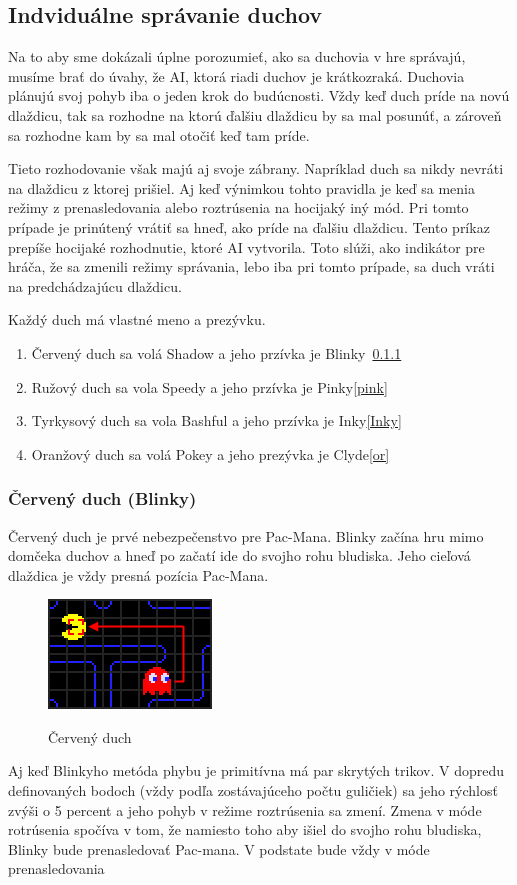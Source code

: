 \documentclass[10pt,oneside,slovak,a4paper]{article}
\begin{document}
\subsection{Indviduálne správanie duchov}
Na to aby sme dokázali úplne porozumieť, ako sa duchovia v hre správajú, musíme brať do úvahy, že AI, ktorá riadi duchov je krátkozraká. Duchovia plánujú svoj pohyb iba o jeden krok do budúcnosti. Vždy keď duch príde na novú dlaždicu, tak sa rozhodne na ktorú ďalšiu dlaždicu by sa mal posunúť, a zároveň sa rozhodne kam by sa mal otočiť keď tam príde. 

Tieto rozhodovanie však majú aj svoje zábrany. Napríklad duch sa nikdy nevráti na dlaždicu z ktorej prišiel. Aj keď výnimkou tohto pravidla je keď sa menia režimy z prenasledovania alebo roztrúsenia na hocijaký iný mód. Pri tomto prípade je prinútený vrátiť sa hneď, ako príde na ďalšiu dlaždicu. Tento príkaz prepíše hocijaké rozhodnutie, ktoré AI vytvorila. Toto slúži, ako indikátor pre hráča, že sa zmenili režimy správania, lebo iba pri tomto prípade, sa duch vráti na predchádzajúcu dlaždicu.\cite{2.zdroj}

Každý duch má vlastné meno a prezývku.
\begin{enumerate}
    \item Červený duch sa volá Shadow a jeho przívka je Blinky~\ref{cerv}
    \item Ružový duch sa vola Speedy a jeho przívka je Pinky\ref{pink}
    \item Tyrkysový duch sa vola Bashful a jeho przívka je Inky\ref{Inky}
     \item Oranžový duch sa volá Pokey a jeho prezývka je Clyde\ref{or}
\end{enumerate}

\subsubsection{Červený duch (Blinky)}\label{cerv}
Červený duch je prvé nebezpečenstvo pre Pac-Mana. Blinky začína hru mimo domčeka duchov a hneď po začatí ide do svojho rohu bludiska. Jeho cieľová dlaždica je vždy presná pozícia Pac-Mana.
\begin{figure} [h!]
  \includegraphics[scale=0.6]{blinky-targeting.png}
  \caption{Červený duch}
  \cite{2.zdroj}
\end{figure}
Aj keď Blinkyho metóda phybu je primitívna má par skrytých trikov. V dopredu definovaných bodoch (vždy podľa zostávajúceho počtu guličiek) sa jeho rýchlosť zvýši o 5 percent a jeho pohyb v režime roztrúsenia sa zmení. Zmena v móde rotrúsenia spočíva v tom, že namiesto toho aby išiel do svojho rohu bludiska, Blinky bude prenasledovať Pac-mana. V podstate bude vždy v móde prenasledovania
\end{document}
